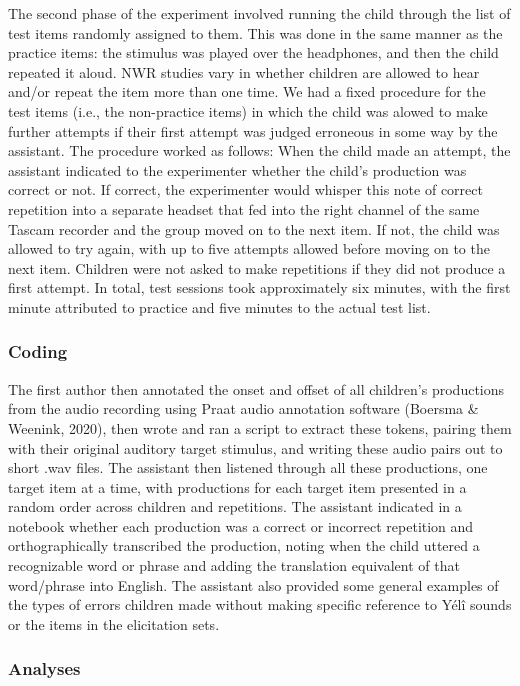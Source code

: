 \documentclass[english,,man,floatsintext]{apa6}
\begin{document}
The second phase of the experiment involved running the child through the list of test items randomly assigned to them. This was done in the same manner as the practice items: the stimulus was played over the headphones, and then the child repeated it aloud. NWR studies vary in whether children are allowed to hear and/or repeat the item more than one time. We had a fixed procedure for the test items (i.e., the non-practice items) in which the child was alowed to make further attempts if their first attempt was judged erroneous in some way by the assistant. The procedure worked as follows: When the child made an attempt, the assistant indicated to the experimenter whether the child's production was correct or not. If correct, the experimenter would whisper this note of correct repetition into a separate headset that fed into the right channel of the same Tascam recorder and the group moved on to the next item. If not, the child was allowed to try again, with up to five attempts allowed before moving on to the next item. Children were not asked to make repetitions if they did not produce a first attempt. In total, test sessions took approximately six minutes, with the first minute attributed to practice and five minutes to the actual test list.

\hypertarget{coding}{%
\subsubsection{Coding}\label{coding}}

The first author then annotated the onset and offset of all children's productions from the audio recording using Praat audio annotation software (Boersma \& Weenink, 2020), then wrote and ran a script to extract these tokens, pairing them with their original auditory target stimulus, and writing these audio pairs out to short .wav files. The assistant then listened through all these productions, one target item at a time, with productions for each target item presented in a random order across children and repetitions. The assistant indicated in a notebook whether each production was a correct or incorrect repetition and orthographically transcribed the production, noting when the child uttered a recognizable word or phrase and adding the translation equivalent of that word/phrase into English. The assistant also provided some general examples of the types of errors children made without making specific reference to Yélî sounds or the items in the elicitation sets.

\hypertarget{analyses}{%
\subsubsection{Analyses}\label{analyses}}
\end{document}
